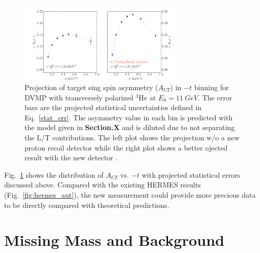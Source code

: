 \begin{figure}[!ht]
 \begin{center}
      \includegraphics[type=pdf, ext=.pdf,read=.pdf,width=0.7\textwidth]{./figures/bin_asym_t}
      \caption{\footnotesize{Projection of target sing spin asymmetry ($A_{UT}$) in $-t$ binning for DVMP with transversely polarized $\mathrm{^{3}He}$ at $E_{0}=11~GeV$. The error bars are the projected statistical uncertainties defined in Eq.~\ref{stat_err}. The asymmetry value in each bin is predicted with the model given in {\bf Section.X} and is diluted due to not separating the L/T contributions. The left plot shows the projection w/o a new proton recoil detector while the right plot shows a better ojected result with the new detector .}}
  \label{asym_t}
  \end{center}
\end{figure}
Fig.~\ref{asym_t} shows the distribution of $A_{UT}$ vs. $-t$ with projected statistical errors discussed above. Compared with the existing HERMES results (Fig.~\ref{fig:hermes_aut}), the new measurement could provide more precious data to be directly compared with theoretical predictions. 

\section{Missing Mass and Background}

